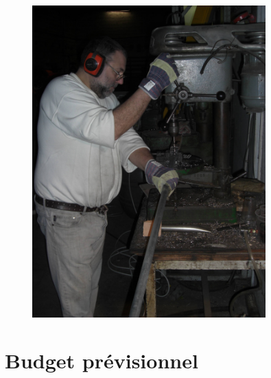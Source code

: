\documentclass[a4paper,12pt]{report}
\begin{document}
\begin{figure}[!h]
\centering
\includegraphics[width=9cm]{percage.jpg}
\end{figure}


\chapter{Budget prévisionnel}
\end{document}
